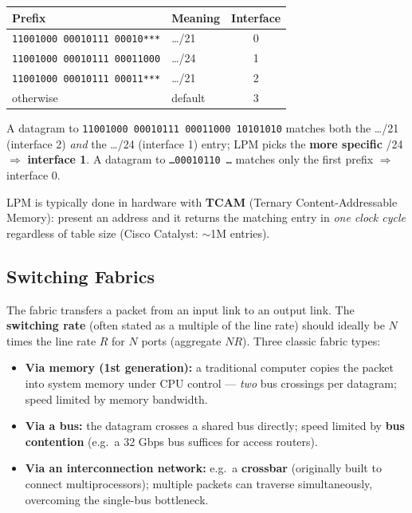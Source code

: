 \documentclass[hidelinks]{article}
\begin{document}
\renewcommand{\arraystretch}{1.3}
\noindent\begin{tabularx}{\textwidth}{|l|X|c|}
\hline
\textbf{Prefix} & \textbf{Meaning} & \textbf{Interface} \\
\hline
\texttt{11001000 00010111 00010***} & \dots/21 & 0 \\
\hline
\texttt{11001000 00010111 00011000} & \dots/24 & 1 \\
\hline
\texttt{11001000 00010111 00011***} & \dots/21 & 2 \\
\hline
otherwise & default & 3 \\
\hline
\end{tabularx}

\medskip
\noindent A datagram to \texttt{11001000 00010111 00011000 10101010} matches
both the \dots/21 (interface 2) \emph{and} the \dots/24 (interface 1) entry;
LPM picks the \textbf{more specific} /24 $\Rightarrow$ \textbf{interface 1}.
A datagram to \texttt{\dots 00010110 \dots} matches only the first prefix
$\Rightarrow$ interface 0.

LPM is typically done in hardware with \textbf{TCAM} (Ternary
Content-Addressable Memory): present an address and it returns the matching
entry in \emph{one clock cycle} regardless of table size (Cisco Catalyst:
$\sim$1M entries).

\subsection{Switching Fabrics}

The fabric transfers a packet from an input link to an output link. The
\textbf{switching rate} (often stated as a multiple of the line rate) should
ideally be $N$ times the line rate $R$ for $N$ ports (aggregate $NR$). Three
classic fabric types:
\begin{itemize}
    \item \textbf{Via memory (1st generation):} a traditional computer copies
    the packet into system memory under CPU control --- \emph{two} bus
    crossings per datagram; speed limited by memory bandwidth.
    \item \textbf{Via a bus:} the datagram crosses a shared bus directly;
    speed limited by \textbf{bus contention} (e.g.\ a 32 Gbps bus suffices for
    access routers).
    \item \textbf{Via an interconnection network:} e.g.\ a \textbf{crossbar}
    (originally built to connect multiprocessors); multiple packets can
    traverse simultaneously, overcoming the single-bus bottleneck.
\end{itemize}
\end{document}
